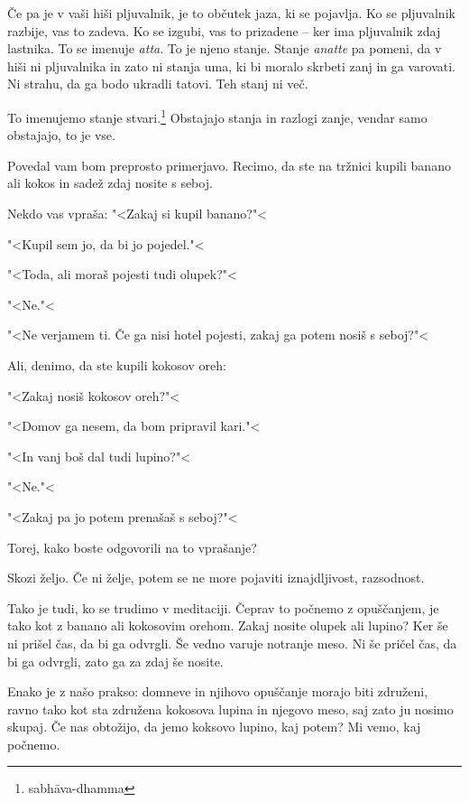 Če pa je v vaši hiši pljuvalnik, je to občutek jaza, ki se pojavlja. Ko se pljuvalnik razbije, vas to zadeva. Ko se izgubi, vas to prizadene – ker ima pljuvalnik zdaj lastnika. To se imenuje \emph{atta}. To je njeno stanje. Stanje \emph{anatte} pa pomeni, da v hiši ni pljuvalnika in zato ni stanja uma, ki bi moralo skrbeti zanj in ga varovati. Ni strahu, da ga bodo ukradli tatovi. Teh stanj ni več.

To imenujemo stanje stvari.\footnote{sabhāva-dhamma} Obstajajo stanja in razlogi zanje, vendar samo obstajajo, to je vse.

\clearpage

\enlargethispage{10cm}


Povedal vam bom preprosto primerjavo. Recimo, da ste na tržnici kupili banano ali kokos in sadež zdaj nosite s seboj.

Nekdo vas vpraša: "<Zakaj si kupil banano?"<

"<Kupil sem jo, da bi jo pojedel."<

"<Toda, ali moraš pojesti tudi olupek?"<

"<Ne."<

"<Ne verjamem ti. Če ga nisi hotel pojesti, zakaj ga potem nosiš s seboj?"<

Ali, denimo, da ste kupili kokosov oreh:

"<Zakaj nosiš kokosov oreh?"<

"<Domov ga nesem, da bom pripravil kari."<

"<In vanj boš dal tudi lupino?"<

"<Ne."<

"<Zakaj pa jo potem prenašaš s seboj?"<

Torej, kako boste odgovorili na to vprašanje?

Skozi željo. Če ni želje, potem se ne more pojaviti iznajdljivost, razsodnost.

Tako je tudi, ko se trudimo v meditaciji. Čeprav to počnemo z opuščanjem, je tako kot z banano ali kokosovim orehom. Zakaj nosite olupek ali lupino? Ker še ni prišel čas, da bi ga odvrgli. Še vedno varuje notranje meso. Ni še pričel čas, da bi ga odvrgli, zato ga za zdaj še nosite.

Enako je z našo prakso: domneve in njihovo opuščanje morajo biti združeni, ravno tako kot sta združena kokosova lupina in njegovo meso, saj zato ju nosimo skupaj. Če nas obtožijo, da jemo koksovo lupino, kaj potem? Mi vemo, kaj počnemo.

